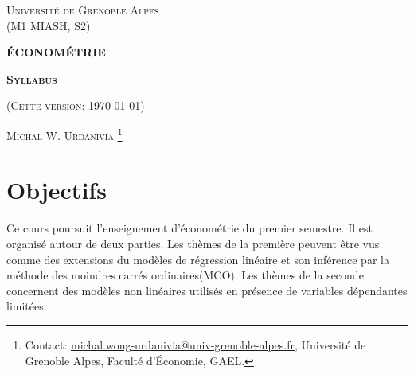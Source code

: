 \documentclass[10pt, reqno]{amsart}
\begin{document}
 
\usetikzlibrary{positioning}
\usetikzlibrary{snakes}
\usetikzlibrary{calc}
\usetikzlibrary{arrows}
\usetikzlibrary{decorations.markings}
\usetikzlibrary{shapes.misc}
\usetikzlibrary{shapes}

%

\begin{titlepage}
\centering
	{\scshape\Large \textsc{Université de Grenoble Alpes\\(M1 MIASH, S2)}\par}
	\vspace{0.5cm}
	{\Large\bfseries \scshape\Large \textsc{ÉCONOMÉTRIE}\par}
	\vspace{0.5cm}
	{\Large\bfseries \textsc{Syllabus} \par}
    \vspace{0.5cm}   
	{(\textsc{Cette version: \today})\par}
	\vspace{1cm}
	{\large \textsc{Michal W. Urdanivia}
	\footnote{Contact:  
	\href{mailto:michal.wong-urdanivia@univ-grenoble-alpes.fr}{michal.wong-urdanivia@univ-grenoble-alpes.fr}, 
	 Université de Grenoble Alpes,  Faculté d'\'Economie, GAEL.}\par}
	
\end{titlepage}


\newpage

\tableofcontents

\newpage

\section{Objectifs}
Ce cours poursuit l'enseignement d'économétrie du premier semestre. Il est organisé autour de deux parties. 
Les thèmes de la première peuvent être vus comme des extensions du modèles de régression linéaire 
et son inférence par la méthode des moindres carrés ordinaires(MCO). Les thèmes de la seconde concernent 
des modèles non linéaires utilisés en présence de variables dépendantes limitées.
\end{document}
